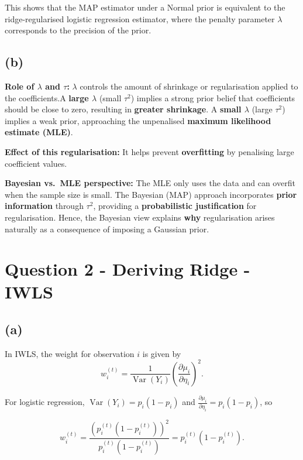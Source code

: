 \documentclass[12pt,halfline,a4paper,]{ouparticle}
\begin{document}
This shows that the MAP estimator under a Normal prior is equivalent to
the ridge-regularised logistic regression estimator, where the penalty
parameter \(\lambda\) corresponds to the precision of the prior.

\subsection{(b)}\label{b}

\textbf{Role of \(\lambda\) and \(\tau\):} \(\lambda\) controls the
amount of shrinkage or regularisation applied to the coefficients.A
\textbf{large \(\lambda\)} (small \(\tau^2\)) implies a strong prior
belief that coefficients should be close to zero, resulting in
\textbf{greater shrinkage}. A \textbf{small \(\lambda\)} (large
\(\tau^2\)) implies a weak prior, approaching the unpenalised
\textbf{maximum likelihood estimate (MLE)}.

\textbf{Effect of this regularisation:} It helps prevent
\textbf{overfitting} by penalising large coefficient values.

\textbf{Bayesian vs.~MLE perspective:} The MLE only uses the data and
can overfit when the sample size is small. The Bayesian (MAP) approach
incorporates \textbf{prior information} through \(\tau^2\), providing a
\textbf{probabilistic justification} for regularisation. Hence, the
Bayesian view explains \textbf{why} regularisation arises naturally as a
consequence of imposing a Gaussian prior.

\section{Question 2 - Deriving Ridge -
IWLS}\label{question-2---deriving-ridge---iwls}

\subsection{(a)}\label{a-1}

In IWLS, the weight for observation \(i\) is given by \[
w_i^{(t)} = \frac{1}{\operatorname{Var}(Y_i)} \left(\frac{\partial \mu_i}{\partial \eta_i}\right)^2.
\]

For logistic regression, \(\operatorname{Var}(Y_i) = p_i (1 - p_i)\) and
\(\frac{\partial \mu_i}{\partial \eta_i} = p_i (1 - p_i)\), so

\[
w_i^{(t)} = \frac{\left(p_i^{(t)} (1 - p_i^{(t)})\right)^2}{p_i^{(t)} (1 - p_i^{(t)})} 
= p_i^{(t)} (1 - p_i^{(t)}).
\]
\end{document}
